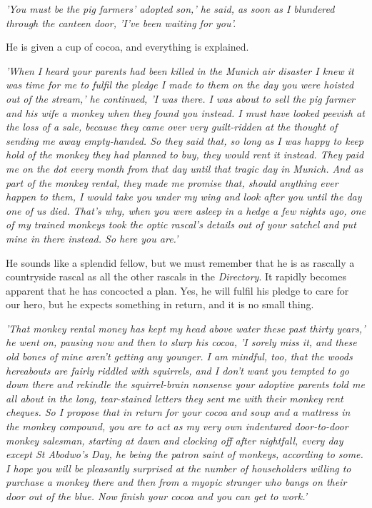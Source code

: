 \emph{'You must be the pig farmers' adopted son,' he said, as soon as I blundered through the canteen door, 'I've been waiting for you'.}

He is given a cup of cocoa, and everything is explained.

\emph{'When I heard your parents had been killed in the Munich air disaster I knew it was time for me to fulfil the pledge I made to them on the day you were hoisted out of the stream,' he continued, 'I was there. I was about to sell the pig farmer and his wife a monkey when they found you instead. I must have looked peevish at the loss of a sale, because they came over very guilt-ridden at the thought of sending me away empty-handed. So they said that, so long as I was happy to keep hold of the monkey they had planned to buy, they would rent it instead. They paid me on the dot every month from that day until that tragic day in Munich. And as part of the monkey rental, they made me promise that, should anything ever happen to them, I would take you under my wing and look after you until the day one of us died. That's why, when you were asleep in a hedge a few nights ago, one of my trained monkeys took the optic rascal's details out of your satchel and put mine in there instead. So here you are.'}

He sounds like a splendid fellow, but we must remember that he is as rascally a countryside rascal as all the other rascals in the \emph{Directory}. It rapidly becomes apparent that he has concocted a plan. Yes, he will fulfil his pledge to care for our hero, but he expects something in return, and it is no small thing.

\emph{'That monkey rental money has kept my head above water these past thirty years,' he went on, pausing now and then to slurp his cocoa, 'I sorely miss it, and these old bones of mine aren't getting any younger. I am mindful, too, that the woods hereabouts are fairly riddled with squirrels, and I don't want you tempted to go down there and rekindle the squirrel-brain nonsense your adoptive parents told me all about in the long, tear-stained letters they sent me with their monkey rent cheques. So I propose that in return for your cocoa and soup and a mattress in the monkey compound, you are to act as my very own indentured door-to-door monkey salesman, starting at dawn and clocking off after nightfall, every day except St Abodwo's Day, he being the patron saint of monkeys, according to some. I hope you will be pleasantly surprised at the number of householders willing to purchase a monkey there and then from a myopic stranger who bangs on their door out of the blue. Now finish your cocoa and you can get to work.'}

